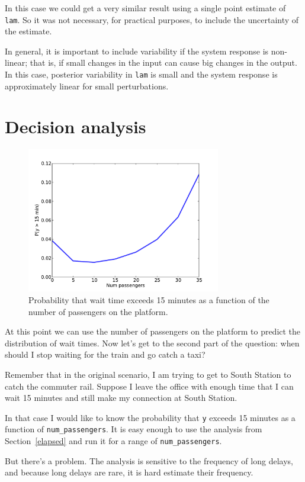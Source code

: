 \documentclass[12pt]{book}
\begin{document}
In this case we could get a very similar result using a single point
estimate of {\tt lam}.  So it was not necessary, for practical purposes,
to include the uncertainty of the estimate.

In general, it is important to include variability if the system
response is non-linear; that is, if small changes in the input can
cause big changes in the output.  In this case, posterior variability
in {\tt lam} is small and the system response is approximately
linear for small perturbations.


\section{Decision analysis}

\begin{figure}
\centerline{\includegraphics[height=2.5in]{figs/redline5.pdf}}
\caption{Probability that wait time exceeds 15 minutes as
a function of the number of passengers on the platform. }
\label{fig.redline5}
\end{figure}

At this point we can use the number of passengers on the platform
to predict the distribution of wait times.  Now
let's get to the second part of the question: when should I stop
waiting for the train and go catch a taxi?

Remember that in the original scenario, I am trying to get to
South Station to catch the commuter rail.  Suppose I leave
the office with enough time that I can wait 15 minutes
and still make my connection at South Station.

In that case I would like to know the probability that {\tt y} exceeds
15 minutes as a function of \verb"num_passengers".  It is easy enough
to use the
analysis from Section~\ref{elapsed} and run it for a range of
\verb"num_passengers".

But there's a problem.
The analysis is sensitive to the frequency of long delays, and
because long delays are rare, it is hard estimate
their frequency.
\end{document}
